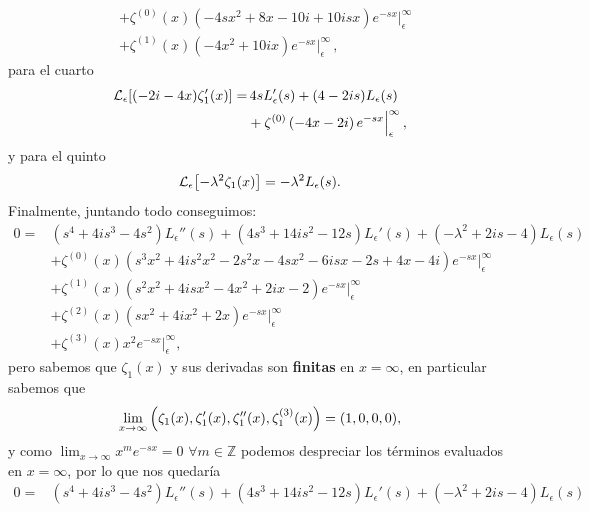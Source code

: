 \documentclass[%
 aip,
 jmp,%
 amsmath,amssymb,
 reprint,%
]{revtex4-2}
\begin{document}
{\begin{equation}
\begin{aligned}
        &+\zeta^{(0)}(x) \left(-4sx^2 + 8x -10 i  +10 i s x  \right)e^{-sx}\Big|_\epsilon^\infty\\
        &+\zeta^{(1)}(x) \left(-4 x^2  +10 i x  \right)e^{-sx}\Big|_\epsilon^\infty\,,
    \end{aligned}
\end{equation}
para el cuarto
\begin{equation}
    \begin{aligned}
        \mathcal{L}_\epsilon\qty[(-2i-4x)\zeta_1'(x)]=&\,4 s L_\epsilon'(s) + (4-2is)L_\epsilon(s)\\
        &+\zeta^{(0)} \left(-4 x-2 i\right)e^{-sx}\Big|_\epsilon^\infty\,,
    \end{aligned}
\end{equation}
y para el quinto
\begin{equation}
    \mathcal{L}_\epsilon\qty[-\lambda^2\zeta_1(x)]=-\lambda^2L_\epsilon(s).
\end{equation}
Finalmente, juntando todo conseguimos:
\begin{equation}
\begin{aligned}
0=&\left(s^4+4 i s^3-4 s^2\right) L_\epsilon''(s)+\left(4 s^3+14 i s^2-12 s\right) L_\epsilon'(s)+ \left(-\lambda ^2+2 i s-4\right)L_\epsilon(s)\\
&+\zeta^{(0)}(x) \left(s^3 x^2+4 i s^2 x^2-2 s^2 x-4 s x^2-6 i s x-2 s+4 x-4 i\right)e^{-sx}\Big|_\epsilon^\infty\\
&+\zeta^{(1)}(x) \left(s^2 x^2+4 i s x^2-4 x^2+2 i x-2\right)e^{-sx}\Big|_\epsilon^\infty\\
&+\zeta^{(2)}(x) \left(s x^2+4 i x^2+2 x\right)e^{-sx}\Big|_\epsilon^\infty\\
&+\zeta^{(3)}(x) x^2 e^{-s x}\Big|_\epsilon^\infty,
\end{aligned}
\end{equation}
pero sabemos que $\zeta_1(x)$ y sus derivadas son \textbf{finitas} en $x=\infty$, en particular sabemos que
\begin{equation}
    \lim_{x\to\infty}\qty(\zeta_1(x),\zeta_1'(x),\zeta_1''(x),\zeta_1^{(3)}(x))=(1,0,0,0),
\end{equation}
y como $\lim_{x\to\infty}x^m e^{-sx}=0$ $\forall m\in \mathbb{Z}$ podemos despreciar los términos evaluados en $x=\infty$, por lo que nos quedaría
\begin{equation}\label{eq:EDOL-TLepsilon}
\begin{aligned}
0=&\left(s^4+4 i s^3-4 s^2\right) L_\epsilon''(s)+\left(4 s^3+14 i s^2-12 s\right) L_\epsilon'(s)+ \left(-\lambda ^2+2 i s-4\right)L_\epsilon(s)\\

\end{aligned}
\end{equation}}
\end{document}
